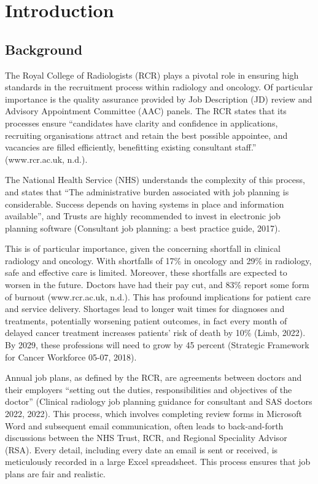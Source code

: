 \section{Introduction}
\subsection{Background}
The Royal College of Radiologists (RCR) plays a pivotal role in ensuring high standards in the recruitment process within radiology and oncology. Of particular importance is the quality assurance provided by Job Description (JD) review and Advisory Appointment Committee (AAC) panels. The RCR states that its processes ensure “candidates have clarity and confidence in applications, recruiting organisations attract and retain the best possible appointee, and vacancies are filled efficiently, benefitting existing consultant staff.” (www.rcr.ac.uk, n.d.). 

The National Health Service (NHS) understands the complexity of this process, and states that “The administrative burden associated with job planning is considerable. Success depends on having systems in place and information available”, and Trusts are highly recommended to invest in electronic job planning software (Consultant job planning: a best practice guide, 2017).

This is of particular importance, given the concerning shortfall in clinical radiology and oncology. With shortfalls of 17\% in oncology and 29\% in radiology, safe and effective care is limited. Moreover, these shortfalls are expected to worsen in the future. Doctors have had their pay cut, and 83\% report some form of burnout (www.rcr.ac.uk, n.d.). This has profound implications for patient care and service delivery. Shortages lead to longer wait times for diagnoses and treatments, potentially worsening patient outcomes, in fact every month of delayed cancer treatment increases patients’ risk of death by 10\% (Limb, 2022). By 2029, these professions will need to grow by 45 percent (Strategic Framework for Cancer Workforce 05-07, 2018).

Annual job plans, as defined by the RCR, are agreements between doctors and their employers “setting out the duties, responsibilities and objectives of the doctor” (Clinical radiology job planning guidance for consultant and SAS doctors 2022, 2022). This process, which involves completing review forms in Microsoft Word and subsequent email communication, often leads to back-and-forth discussions between the NHS Trust, RCR, and Regional Speciality Advisor (RSA). Every detail, including every date an email is sent or received, is meticulously recorded in a large Excel spreadsheet. This process ensures that job plans are fair and realistic.

